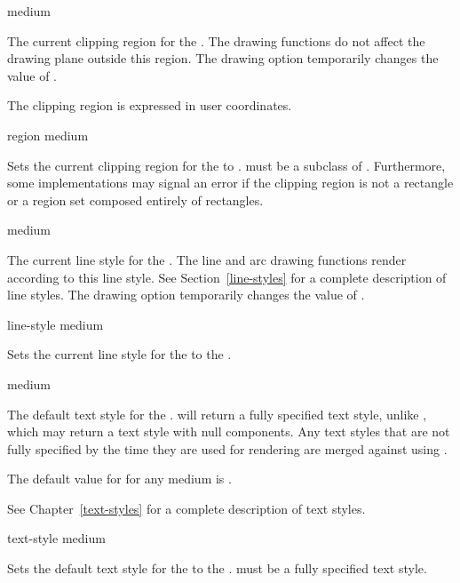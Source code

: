  {medium}

The current clipping region for the  .  The drawing
functions do not affect the drawing plane outside this region.  The
 drawing option temporarily changes the value of
.

The clipping region is expressed in user coordinates.

 {region medium}

Sets the current clipping region for the   to
.   must be a subclass of .  Furthermore, some
implementations may signal an error if the clipping region is not a rectangle or
a region set composed entirely of rectangles.


 {medium}

The current line style for the  .  The line and arc
drawing functions render according to this line style.  See
Section~\ref{line-styles} for a complete description of line styles.  The
 drawing option temporarily changes the value of
.

 {line-style medium}

Sets the current line style for the   to the  .


 {medium}

The default text style for the  .
 will return a fully specified text style, unlike
, which may return a text style with null components.  Any
text styles that are not fully specified by the time they are used for rendering
are merged against  using .

The default value for  for any medium is
.

See Chapter~\ref{text-styles} for a complete description of text styles.

 {text-style medium}

Sets the default text style for the   to the  .   must be a fully specified text style.

